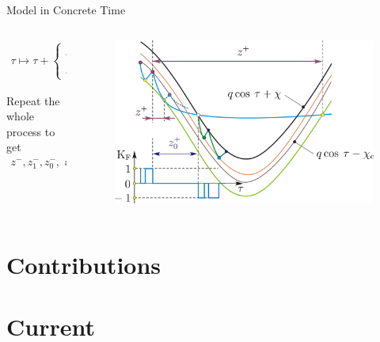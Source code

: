 \begin{frame}{Model in Concrete Time}
	\vspace{-1em}
	\begin{columns}
		\begin{column}{.5 \textwidth}
			\begin{align*}
				\tau \mapsto  \tau + \begin{cases}
					                     z^{+} + z_{1}^{+}     & \text{if } z^{+} \leq z_{0}^{+} \\
					                     z_{0}^{+} + z_{2}^{+} & \text{if } z^{+} > z_{0}^{+}
				                     \end{cases}
			\end{align*}
			\vspace{1em}

			Repeat the whole process to get
			\begin{align*}
				z^{-}, z_{1}^{-}, z_{0}^{-}, \text{ and } z_{2}^{-}
			\end{align*}
		\end{column}
		\begin{column}{.5 \textwidth}
			\begin{figure}
				\includegraphics[width=1 \textwidth]{Figs/discrete_model_derivation_cases.png}
			\end{figure}
		\end{column}
	\end{columns}

	\flushright{[Avrutin]}
\end{frame}

\section{Contributions}

\section{Current}

%
%
%
%
%

\thanksframe

